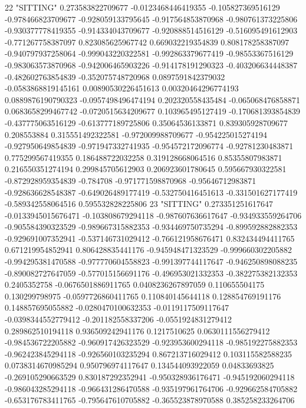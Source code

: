 22 "SITTING" 0.273583822709677 -0.0123468446419355 -0.105827369516129 -0.978466823709677 -0.928059133795645 -0.917564853870968 -0.980761373225806 -0.930377778419355 -0.914334043709677 -0.920888514516129 -0.516095491612903 -0.771267758387097 0.823085625967742 0.669032219354839 0.808178258387097 -0.940797937258064 -0.999043220322581 -0.992863379677419 -0.98553367516129 -0.983063573870968 -0.942006465903226 -0.914178191290323 -0.403206634448387 -0.482602763854839 -0.352075748720968 0.0897591842379032 -0.0583868819145161 0.00890530226451613 0.00320464296774193 0.0889876190790323 -0.0957498496474194 0.202320558435484 -0.065068476858871 0.0683658299467742 -0.0720515634209677 0.103965495127419 -0.170681393854839 -0.437775063516129 -0.613777189725806 0.35064536133871 0.839305928709677 0.208553884 0.315551492322581 -0.972009988709677 -0.954225015274194 -0.927950649854839 -0.971947332741935 -0.954572172096774 -0.92781230483871 0.775299567419355 0.186488722032258 0.319128668064516 0.85355807983871 0.216550351274194 0.299845705612903 0.206923601780645 0.595667930322581 -0.872928959354839 -0.784708 -0.971771598870968 -0.95646712983871 -0.928636628548387 -0.649026489177419 -0.532750416451613 -0.331501627177419 -0.589342558064516 0.595532828225806
23 "SITTING" 0.273351251617647 -0.0133945015676471 -0.103808679294118 -0.987607636617647 -0.934933559264706 -0.905584390323529 -0.989667315882353 -0.934469750735294 -0.899592882882353 -0.929691007352941 -0.537146731029412 -0.766121958676471 0.832434494411765 0.671219954852941 0.806428835441176 -0.945948471323529 -0.999660302205882 -0.994295381470588 -0.977770604558823 -0.991397744117647 -0.946250898088235 -0.890082727647059 -0.577015156691176 -0.496953021332353 -0.382275382132353 0.2405352758 -0.0676501886911765 0.0408236267897059 0.110655504175 0.130299798975 -0.0597726860411765 0.110840145644118 0.128854769191176 0.148857695055882 -0.0280470100632353 -0.0119117509117647 -0.0398344552779412 -0.201182558337206 -0.0551924831279412 0.289862510194118 0.936509242941176 0.1217510625 0.0630111556279412 -0.984536722205882 -0.960917426323529 -0.923953600294118 -0.985192275882353 -0.962423845294118 -0.926560103235294 0.867213716029412 0.103115582588235 0.0738314670985294 0.950796974117647 0.134544093922059 0.04833693825 -0.269105290663529 0.830187292352941 -0.950328936176471 -0.945192060294118 -0.986043285294118 -0.966431286470588 -0.935197961764706 -0.929662584705882 -0.653176783411765 -0.795647610705882 -0.365523878970588 0.385258233264706
